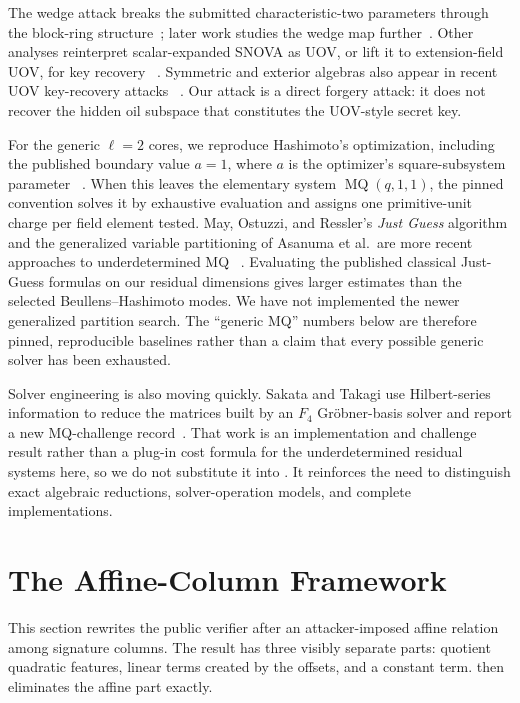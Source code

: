 \documentclass[11pt]{article}
\newcommand{\SNOVA}{\textsf{SNOVA}}
\begin{document}
The wedge attack breaks the submitted characteristic-two parameters through
the block-ring structure~\cite{BrosEtAl2026SNOVAWedge}; later work studies the
wedge map further~\cite{TsengEtAl2026Wedge}.  Other analyses reinterpret
scalar-expanded \SNOVA{} as UOV, or lift it to extension-field UOV, for key
recovery~%
\cite{IkematsuAkiyama2024,LiDing2024,NakamuraEtAl2025}.  Symmetric and
exterior algebras also appear in recent UOV key-recovery attacks~%
\cite{JinEtAl2026,Ran2026}.  Our attack is a direct forgery attack: it does not
recover the hidden oil subspace that constitutes the UOV-style secret key.

For the generic $\ell=2$ cores, we reproduce Hashimoto's optimization,
including the published boundary value $a=1$, where $a$ is the optimizer's
square-subsystem parameter~%
\cite{Hashimoto2023,Beullens2024SNOVA}.  When this leaves the elementary system
$\operatorname{MQ}(q,1,1)$, the pinned convention solves it by exhaustive evaluation and
assigns one primitive-unit charge per field element tested.  May, Ostuzzi, and Ressler's \emph{Just
Guess} algorithm and the generalized variable partitioning of Asanuma et al.\ are more recent approaches to underdetermined MQ~%
\cite{MayOstuzziRessler2026,AsanumaEtAl2026}.  Evaluating the published
classical Just-Guess formulas on our residual dimensions gives larger estimates
than the selected Beullens--Hashimoto modes.  We have not implemented the newer
generalized partition search.  The ``generic MQ'' numbers below are therefore
pinned, reproducible baselines rather than a claim that every possible generic
solver has been exhausted.

Solver engineering is also moving quickly.  Sakata and Takagi use
Hilbert-series information to reduce the matrices built by an $F_4$
Gr\"obner-basis solver and report a new MQ-challenge
record~\cite{SakataTakagi2026}.  That work is an
implementation and challenge result rather than a plug-in cost formula for the
underdetermined residual systems here, so we do not substitute it into
.  It reinforces the need to distinguish exact algebraic
reductions, solver-operation models, and complete implementations.


\section{The Affine-Column Framework}\label{sec:prelim}

This section rewrites the public verifier after an attacker-imposed affine
relation among signature columns.  The result has three visibly separate
parts: quotient quadratic features, linear terms created by the offsets, and a
constant term.   then eliminates the affine part
exactly.
\end{document}
